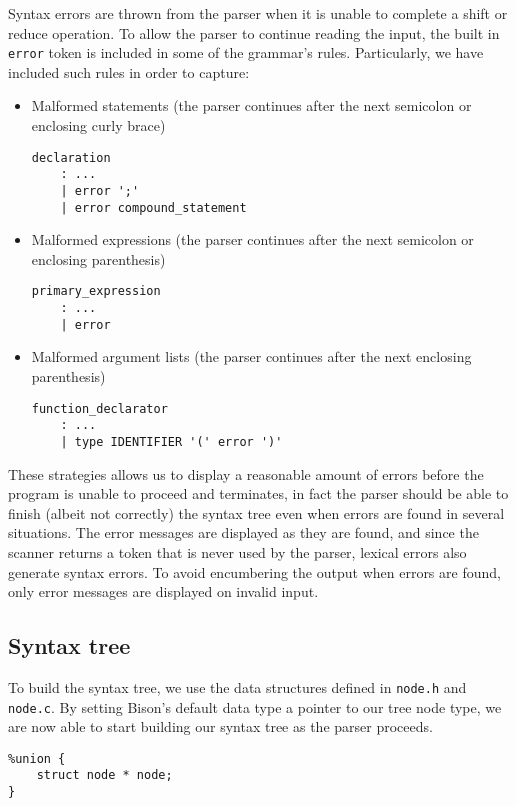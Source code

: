 \documentclass[12pt]{article}
\begin{document}
Syntax errors are thrown from the parser when it is unable to complete a shift or reduce
operation. To allow the parser to continue reading the input, the built in \texttt{error}
token is included in some of the grammar's rules. Particularly, we have included
such rules in order to capture: 

\begin{itemize}
\item  Malformed statements (the parser continues after the next semicolon or enclosing
curly brace)
\begin{lstlisting}
declaration
	: ...
	| error ';'
	| error compound_statement
\end{lstlisting}

\item  Malformed expressions (the parser continues after the next semicolon or enclosing
parenthesis)
\begin{lstlisting}
primary_expression
	: ...
	| error
\end{lstlisting}

\item  Malformed argument lists (the parser continues after the next enclosing parenthesis)
\begin{lstlisting}
function_declarator
	: ...
	| type IDENTIFIER '(' error ')'
\end{lstlisting}
\end{itemize}

These strategies allows us to display a reasonable amount of errors before the program is unable
to proceed and terminates, in fact the parser should be able to finish (albeit not correctly)
the syntax tree even when errors are found in several situations.
The error messages are displayed as they are found, and since the
scanner returns a token that is never used by the parser, lexical errors also generate syntax
errors. To avoid encumbering the output when errors are found, only error messages are
displayed on invalid input.

\subsection{Syntax tree}
To build the syntax tree, we use the data structures defined in \texttt{node.h} and \texttt{node.c}.
By setting Bison's default data type a pointer to our tree node type, we are now able to start
building our syntax tree as the parser proceeds.
\begin{lstlisting}
%union {
	struct node * node;
}
\end{lstlisting}
\end{document}
